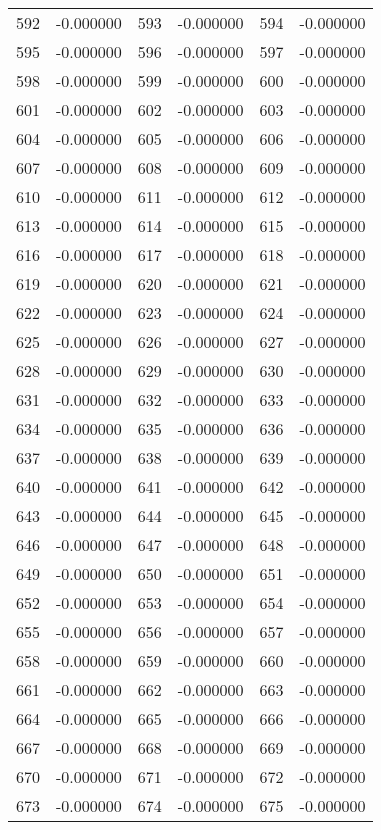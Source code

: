 \documentclass[12pt]{article}
\begin{document}
\begin{longtable}{@{}cc|cc|cc@{}}
592 & -0.000000 & 593 & -0.000000 & 594 & -0.000000 \\
595 & -0.000000 & 596 & -0.000000 & 597 & -0.000000 \\
598 & -0.000000 & 599 & -0.000000 & 600 & -0.000000 \\
601 & -0.000000 & 602 & -0.000000 & 603 & -0.000000 \\
604 & -0.000000 & 605 & -0.000000 & 606 & -0.000000 \\
607 & -0.000000 & 608 & -0.000000 & 609 & -0.000000 \\
610 & -0.000000 & 611 & -0.000000 & 612 & -0.000000 \\
613 & -0.000000 & 614 & -0.000000 & 615 & -0.000000 \\
616 & -0.000000 & 617 & -0.000000 & 618 & -0.000000 \\
619 & -0.000000 & 620 & -0.000000 & 621 & -0.000000 \\
622 & -0.000000 & 623 & -0.000000 & 624 & -0.000000 \\
625 & -0.000000 & 626 & -0.000000 & 627 & -0.000000 \\
628 & -0.000000 & 629 & -0.000000 & 630 & -0.000000 \\
631 & -0.000000 & 632 & -0.000000 & 633 & -0.000000 \\
634 & -0.000000 & 635 & -0.000000 & 636 & -0.000000 \\
637 & -0.000000 & 638 & -0.000000 & 639 & -0.000000 \\
640 & -0.000000 & 641 & -0.000000 & 642 & -0.000000 \\
643 & -0.000000 & 644 & -0.000000 & 645 & -0.000000 \\
646 & -0.000000 & 647 & -0.000000 & 648 & -0.000000 \\
649 & -0.000000 & 650 & -0.000000 & 651 & -0.000000 \\
652 & -0.000000 & 653 & -0.000000 & 654 & -0.000000 \\
655 & -0.000000 & 656 & -0.000000 & 657 & -0.000000 \\
658 & -0.000000 & 659 & -0.000000 & 660 & -0.000000 \\
661 & -0.000000 & 662 & -0.000000 & 663 & -0.000000 \\
664 & -0.000000 & 665 & -0.000000 & 666 & -0.000000 \\
667 & -0.000000 & 668 & -0.000000 & 669 & -0.000000 \\
670 & -0.000000 & 671 & -0.000000 & 672 & -0.000000 \\
673 & -0.000000 & 674 & -0.000000 & 675 & -0.000000 \\

\end{longtable}
\end{document}
